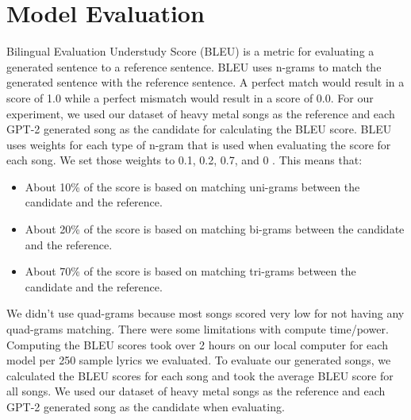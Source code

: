 \documentclass[11pt]{article}
\begin{document}
\section{Model Evaluation}

Bilingual Evaluation Understudy Score (BLEU) is a metric for evaluating a generated sentence to a reference sentence. BLEU uses n-grams to match the generated sentence with the reference sentence. A perfect match would result in a score of 1.0 while a perfect mismatch would result in a score of 0.0. For our experiment, we used our dataset of heavy metal songs as the reference and each GPT-2 generated song as the candidate for calculating the BLEU score. BLEU uses weights for each type of n-gram that is used when evaluating the score for each song. We set those weights to 0.1, 0.2, 0.7, and 0 \cite{brownlee_2019}. This means that:
\begin{itemize}
\item About 10\% of the score is based on matching uni-grams between the candidate and the reference. 
\item About 20\% of the score is based on matching bi-grams between the candidate and the reference. 
\item About 70\% of the score is based on matching tri-grams between the candidate and the reference. 
\end{itemize}

We didn’t use quad-grams because most songs scored very low for not having any quad-grams matching. There were some limitations with compute time/power. Computing the BLEU scores took over 2 hours on our local computer for each model per 250 sample lyrics we evaluated. To evaluate our generated songs, we calculated the BLEU scores for each song and took the average BLEU score for all songs. We used our dataset of heavy metal songs as the reference and each GPT-2 generated song as the candidate when evaluating.
\end{document}
